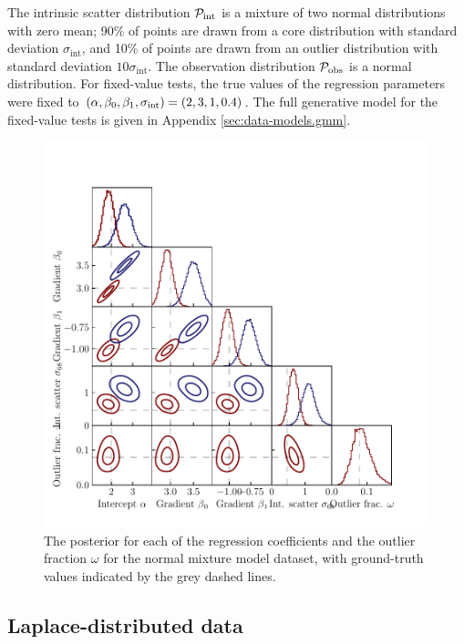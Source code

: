 \documentclass[fleqn,usenatbib]{rasti}
\begin{document}
The intrinsic scatter distribution $\mathcal P_{\rm int}$ is a mixture of two
normal distributions with zero mean; 90\% of points are drawn from a core
distribution with standard deviation $\sigma_\textrm{int}$, and 10\% of points
are drawn from an outlier distribution with standard deviation $10
\sigma_\textrm{int}$. The observation distribution $\mathcal P_{\rm obs}$ is a
normal distribution. For fixed-value tests, the true values of the regression
parameters were fixed to $(\alpha, \beta_0, \beta_1, \sigma_{\rm int}) = (2,
3, 1, 0.4)$. The full generative model for the fixed-value tests is given in
Appendix \ref{sec:data-models.gmm}.

\begin{figure}
    \includegraphics[width=\columnwidth]{graphics/fixed/corner_gaussian_mix.pdf}
    \caption{The posterior for each of the regression coefficients and the
    outlier fraction $\omega$ for the normal mixture model dataset, with
    ground-truth values indicated by the grey dashed lines.}
    \label{fig:results.gmm.corner}
\end{figure}

\subsection{Laplace-distributed data}
\label{sec:results.laplace}
\end{document}
